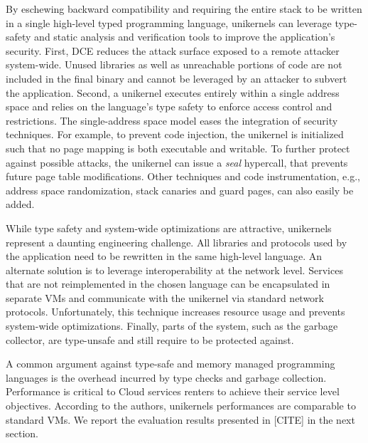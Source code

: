 By eschewing backward compatibility and requiring the entire stack to be written in a single high-level typed programming language, unikernels can leverage type-safety and static analysis and verification tools to improve the application's security.
First, DCE reduces the attack surface exposed to a remote attacker system-wide.
Unused libraries as well as unreachable portions of code are not included in the final binary and cannot be leveraged by an attacker to subvert the application.
Second, a unikernel executes entirely within a single address space and relies on the language's type safety to enforce access control and restrictions.
The single-address space model eases the integration of security techniques. 
For example, to prevent code injection, the unikernel is initialized such that no page mapping is both executable and writable.
To further protect against possible attacks, the unikernel can issue a \emph{seal} hypercall, that prevents future page table modifications.
Other techniques and code instrumentation, e.g., address space randomization, stack canaries and guard pages, can also easily be added.

While type safety and system-wide optimizations are attractive, unikernels represent a daunting engineering challenge.
All libraries and protocols used by the application need to be rewritten in the same high-level language.
An alternate solution is to leverage interoperability at the network level.
Services that are not reimplemented in the chosen language can be encapsulated in separate VMs and communicate with the unikernel via standard network protocols.
Unfortunately, this technique increases resource usage and prevents system-wide optimizations.
Finally, parts of the system, such as the garbage collector, are type-unsafe and still require to be protected against. 

A common argument against type-safe and memory managed programming languages is the overhead incurred by type checks and garbage collection.
Performance is critical to Cloud services renters to achieve their service level objectives.
According to the authors, unikernels performances are comparable to standard VMs.
We report the evaluation results presented in [CITE] in the next section.

